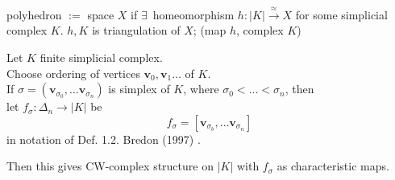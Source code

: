 \begin{definition}
	polyhedron $:= $ space $X$ if $\exists \, $ homeomorphism $h: |K| \xrightarrow{ \approx } X$ for some simplicial complex $K$.  
	$h,K$ is triangulation of $X$; (map $h$, complex $K$)
\end{definition}

Let $K$ finite simplicial complex.  \\
Choose ordering of vertices $\mathbf{v}_0,\mathbf{v}_1\dots $ of $K$.  \\
If $\sigma = (\mathbf{v}_{\sigma_0}, \dots \mathbf{v}_{\sigma_n})$ is simplex of $K$, where $\sigma_0 < \dots < \sigma_n$, then  \\
\phantom{If } let $f_{\sigma} : \Delta_n \to |K|$ be 
\[
f_{\sigma} = [\mathbf{v}_{\sigma_b}, \dots \mathbf{v}_{\sigma_n}]
\]
in notation of Def. 1.2.  Bredon (1997) \cite{agat:Bred1997}.  

Then this gives CW-complex structure on $|K|$ with $f_{\sigma}$ as characteristic maps.  




